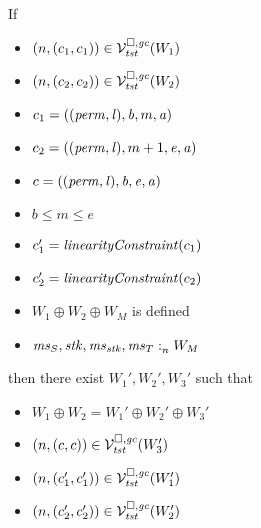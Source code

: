 \begin{lemma}
  \label{lem:splicing-safety-normal}
  If
  \begin{itemize}
  \item $\left(n,(c_1,c_1)\right) \in \mathcal{V}^{\square,\mathit{gc}}_{\mathit{tst}}(W_1)$
  \item $\left(n,(c_2,c_2)\right) \in \mathcal{V}^{\square,\mathit{gc}}_{\mathit{tst}}(W_2)$
  \item $c_1 = ((\mathit{perm},\mathit{l}),\mathit{b},m,\mathit{a})$
  \item $c_2 = ((\mathit{perm},\mathit{l}),m+1,\mathit{e},\mathit{a})$
  \item $c = ((\mathit{perm},\mathit{l}),\mathit{b},\mathit{e},\mathit{a})$
  \item $b \le m \le e$
  \item $c_1' = \linCons{c_1}$
  \item $c_2' = \linCons{c_2}$
  \item $W_1\oplus W_2 \oplus W_M$ is defined
  \item $\mathit{ms}_S,\mathit{stk},\mathit{ms}_{\mathit{stk}},\mathit{ms}_T :_{n}^{}W_M$
  \end{itemize}
  then there exist $W_1',W_2',W_3'$ such that
  \begin{itemize}
  \item $W_1 \oplus W_2 = W_1' \oplus W_2' \oplus W_3'$
  \item $\left(n,(c,c)\right) \in \mathcal{V}^{\square,\mathit{gc}}_{\mathit{tst}}(W_3')$
  \item $\left(n,(c_1',c_1')\right) \in \mathcal{V}^{\square,\mathit{gc}}_{\mathit{tst}}(W_1')$
  \item $\left(n,(c_2',c_2')\right) \in \mathcal{V}^{\square,\mathit{gc}}_{\mathit{tst}}(W_2')$
  \end{itemize}
\end{lemma}

